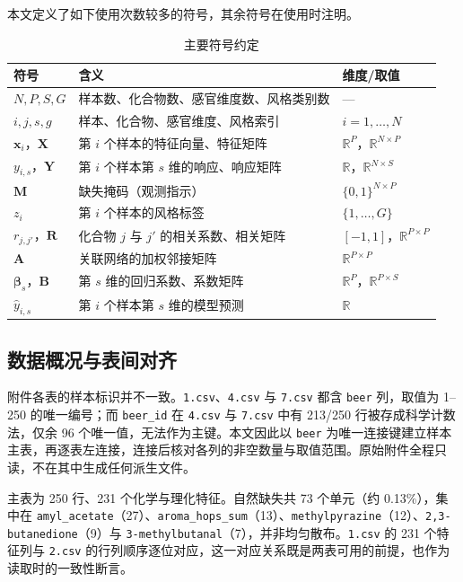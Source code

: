 \documentclass[UTF8,a4paper,zihao=-4]{ctexart}
\numberwithin{figure}{section}
\numberwithin{table}{section}
\numberwithin{equation}{section}
\newcommand{\file}[1]{\texttt{#1}}
\newcommand{\R}{\mathbb{R}}
\newcommand{\vx}{\bm{x}}
\newcommand{\bX}{\bm{X}}
\newcommand{\bY}{\bm{Y}}
\newcommand{\bA}{\bm{A}}
\newcommand{\bR}{\bm{R}}
\newcommand{\bM}{\bm{M}}
\newcommand{\bB}{\bm{B}}
\newcommand{\bbeta}{\bm{\beta}}
\begin{document}
本文定义了如下使用次数较多的符号，其余符号在使用时注明。
\begin{table}[H]
  \centering
  \caption{主要符号约定}
  \label{tab:notation}
  \small
  \begin{tabularx}{\textwidth}{@{}l X l@{}}
    \toprule
    符号 & 含义 & 维度/取值 \\
    \midrule
    $N,P,S,G$ & 样本数、化合物数、感官维度数、风格类别数 & — \\
    $i,j,s,g$ & 样本、化合物、感官维度、风格索引 & $i=1,\dots,N$ \\
    $\vx_i$，$\bX$ & 第 $i$ 个样本的特征向量、特征矩阵 & $\R^{P}$，$\R^{N\times P}$ \\
    $y_{i,s}$，$\bY$ & 第 $i$ 个样本第 $s$ 维的响应、响应矩阵 & $\R$，$\R^{N\times S}$ \\
    $\bM$ & 缺失掩码（观测指示） & $\{0,1\}^{N\times P}$ \\
    $z_i$ & 第 $i$ 个样本的风格标签 & $\{1,\dots,G\}$ \\
    $r_{j,j'}$，$\bR$ & 化合物 $j$ 与 $j'$ 的相关系数、相关矩阵 & $[-1,1]$，$\R^{P\times P}$ \\
    $\bA$ & 关联网络的加权邻接矩阵 & $\R^{P\times P}$ \\
    $\bbeta_s$，$\bB$ & 第 $s$ 维的回归系数、系数矩阵 & $\R^{P}$，$\R^{P\times S}$ \\
    $\hat y_{i,s}$ & 第 $i$ 个样本第 $s$ 维的模型预测 & $\R$ \\
    \bottomrule
  \end{tabularx}
\end{table}

\subsection{数据概况与表间对齐}

附件各表的样本标识并不一致。\file{1.csv}、\file{4.csv} 与 \file{7.csv} 都含 \file{beer} 列，取值为 1--250 的唯一编号；而 \file{beer\_id} 在 \file{4.csv} 与 \file{7.csv} 中有 213/250 行被存成科学计数法，仅余 96 个唯一值，无法作为主键。本文因此以 \file{beer} 为唯一连接键建立样本主表，再逐表左连接，连接后核对各列的非空数量与取值范围。原始附件全程只读，不在其中生成任何派生文件。

主表为 250 行、231 个化学与理化特征。自然缺失共 73 个单元（约 0.13\%），集中在 \file{amyl\_acetate}（27）、\file{aroma\_hops\_sum}（13）、\file{methylpyrazine}（12）、\file{2,3-butanedione}（9）与 \file{3-methylbutanal}（7），并非均匀散布。\file{1.csv} 的 231 个特征列与 \file{2.csv} 的行列顺序逐位对应，这一对应关系既是两表可用的前提，也作为读取时的一致性断言。
\end{document}
